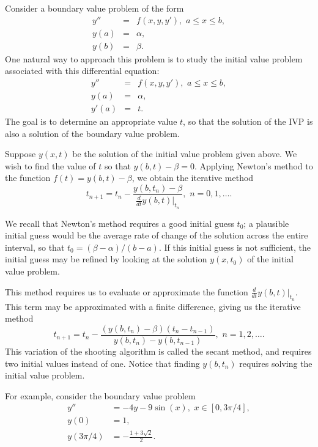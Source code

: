 \label{lab:Shooting}

Consider a boundary value problem of the form 
\begin{eqnarray*}
y'' &=& f(x,y,y'), \,\, a \leq x \leq b, \\
y(a) &=& \alpha, \\
y(b) &=& \beta. 
\end{eqnarray*}
One natural way to approach this problem is to study the initial value problem associated with this differential equation: 
\begin{eqnarray*}
y'' &=& f(x,y,y'), \,\, a \leq x \leq b, \\
y(a) &=& \alpha, \\
y'(a) &=& t. 
\end{eqnarray*}
The goal is to determine an  appropriate value $t$, so that the solution of the IVP is also a solution of the boundary value problem. 

Suppose $y(x,t)$ be the solution of the initial value problem given above. We wish to find the value of $t$ so that 
$y(b,t) - \beta = 0$. 
Applying Newton's method to the function $f(t) = y(b,t) - \beta$, we obtain the iterative method 
\[t_{n+1} = t_n - \frac{ y(b,t_n) - \beta}{\frac{d}{dt} \left.y(b,t)\right|_{t_n} }, \,\, n = 0,1,\hdots .\]

We recall that Newton's method requires a good initial guess $t_0$; a plausible initial guess would be the average rate of change of the solution across the entire interval, so that $t_0 =  (\beta - \alpha)/(b-a)$. If this initial guess is not sufficient, the initial guess may be refined by looking at the solution $y(x,t_0)$ of the initial value problem.

This method requires us to evaluate or approximate the function $\frac{d}{dt} \left.y(b,t)\right|_{t_n}$. This term may be approximated with a finite difference, giving us the iterative method
\[t_{n+1} = t_n - \frac{ (y(b,t_n) - \beta)(t_n - t_{n-1})}{y(b,t_n) - y(b,t_{n-1}) }, \,\, n = 1, 2,\hdots .\]
This variation of the shooting algorithm is called the secant method, and requires two initial values instead of one. Notice that finding $y(b,t_n)$ requires solving the initial value problem.

For example, consider the boundary value problem
\begin{equation}
\begin{split}
\label{bvp1}
y'' &= -4y -9\sin(x), \,\, x \in [0,3\pi/4],\\
y(0) &= 1, \\
y(3 \pi/4) &= -\frac{1+3\sqrt{2}}{2}.
\end{split}
\end{equation}


